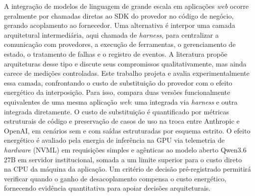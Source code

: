 A integração de modelos de linguagem de grande escala em aplicações \textit{web}
ocorre geralmente por chamadas diretas ao SDK do provedor no código de negócio,
gerando acoplamento ao fornecedor. Uma alternativa é interpor uma camada
arquitetural intermediária, aqui chamada de \textit{harness}, para centralizar a
comunicação com provedores, a execução de ferramentas, o gerenciamento de
estado, o tratamento de falhas e o registro de eventos. A literatura propõe
arquiteturas desse tipo e discute seus compromissos qualitativamente, mas ainda
carece de medições controladas. Este trabalho projeta e avalia experimentalmente
essa camada, confrontando o custo de substituição do provedor com o efeito
energético da interposição. Para isso, compara duas versões funcionalmente
equivalentes de uma mesma aplicação \textit{web}: uma integrada via
\textit{harness} e outra integrada diretamente. O custo de substituição é
quantificado por métricas estruturais de código e preservação de casos de uso
na troca entre Anthropic e OpenAI, em cenários sem e com saídas estruturadas por
esquema estrito. O efeito energético é avaliado pela energia de inferência na GPU
via telemetria de \textit{hardware} (NVML) em requisições simples e agênticas ao
modelo aberto Qwen3.6 27B em servidor institucional, somada a um limite superior
para o custo direto na CPU da máquina da aplicação. Um critério de decisão
pré-registrado permitirá verificar quando o ganho de desacoplamento compensa o
custo energético, fornecendo evidência quantitativa para apoiar decisões
arquiteturais.

